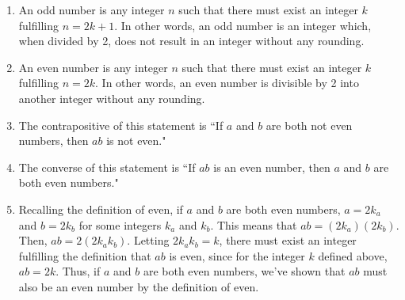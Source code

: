 \documentclass{article}
\begin{document}
\begin{enumerate}
	\item An odd number is any integer $n$ such that there must exist an integer $k$ fulfilling
		$n=2k+1$. In other words, an odd number is an integer which, when divided by 2, does
		not result in an integer without any rounding.
	\item An even number is any integer $n$ such that there must exist an integer $k$ fulfilling
		$n=2k$. In other words, an even number is divisible by 2 into another integer without
		any rounding.
	\item The contrapositive of this statement is ``If $a$ and $b$ are both not even numbers,
		then $ab$ is not even."
	\item The converse of this statement is ``If $ab$ is an even number, then $a$ and $b$ are both 
		even numbers."
	\item Recalling the definition of even, if $a$ and $b$ are both even numbers, $a=2k_a$ and $b=2k_b$
		for some integers $k_a$ and $k_b$. This means that $ab = (2k_a)(2k_b)$. Then, $ab=2(2k_{a}k_{b})$.
		Letting $2k_{a}k_{b}=k$, there must exist an integer fulfilling the definition that
		$ab$ is even, since for the integer $k$ defined above, $ab=2k$. Thus, if $a$ and $b$ are both 
		even numbers, we've shown that $ab$ must also be an even number by the definition of even.
\end{enumerate}
\end{document}
